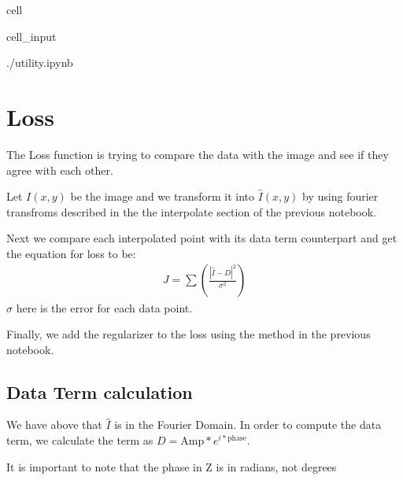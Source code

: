 \documentclass[letterpaper,10pt,english]{jupyterBook}
\begin{document}
\begin{sphinxuseclass}{cell}\begin{sphinxVerbatimInput}

\begin{sphinxuseclass}{cell_input}
\begin{sphinxVerbatim}[commandchars=\\\{\}]
 ./utility.ipynb
\end{sphinxVerbatim}

\end{sphinxuseclass}\end{sphinxVerbatimInput}

\end{sphinxuseclass}

\chapter{Loss}
\label{\detokenize{loss:loss}}\label{\detokenize{loss::doc}}
\sphinxAtStartPar
The Loss function is trying to compare the data with the image and see if they agree with each other.

\sphinxAtStartPar
Let \(I(x,y)\) be the image and we transform it into \(\hat{I} (x,y)\) by using fourier transfroms described in the the interpolate section of the previous notebook.

\sphinxAtStartPar
Next we compare each interpolated point with its data term counterpart and get the equation for loss to be:
\begin{equation*}
\begin{split}J = \sum(\frac{|\hat{I} - D|^2}{\sigma^2})\end{split}
\end{equation*}
\sphinxAtStartPar
\(\sigma\) here is the error for each data point.

\sphinxAtStartPar
Finally, we add the regularizer to the loss using the method in the previous notebook.


\section{Data Term calculation}
\label{\detokenize{loss:data-term-calculation}}
\sphinxAtStartPar
We have above that \(\hat{I}\) is in the Fourier Domain. In order to compute the data term, we calculate the term as \(D = \text{Amp} * e^{i*\text{phase}}\).

\sphinxAtStartPar
It is important to note that the phase in Z is in radians, not degrees
\end{document}
